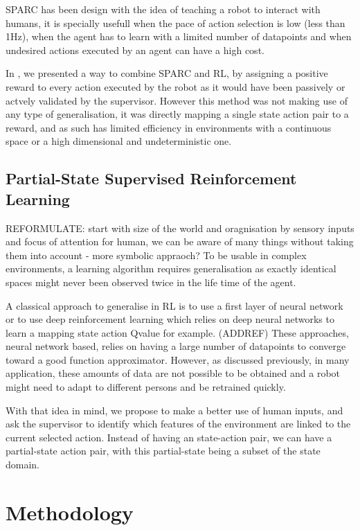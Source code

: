 \documentclass[letterpaper]{article} %
\begin{document}
SPARC has been design with the idea of teaching a robot to interact with humans,
it is specially usefull when the pace of action selection is low (less than
1Hz), when the agent has to learn with a limited number of datapoints and when
undesired actions executed by an agent can have a high cost. 

In \cite{senft2017supervised}, we presented a way to combine SPARC and RL, by
assigning a positive reward to every action executed by the robot as it would
have been passively or actvely validated by the supervisor. However this method
was not making use of any type of generalisation, it was directly mapping a
single state action pair to a reward, and as such has limited efficiency in
environments with a continuous space or a high dimensional and undeterministic
one.

\subsection{Partial-State Supervised Reinforcement Learning}

REFORMULATE: start with size of the world and oragnisation by sensory inputs and
focus of attention for human, we can be aware of many things without taking them
into account - more symbolic appraoch?
To be usable in complex environments, a
learning algorithm requires generalisation as exactly identical spaces might
never been observed twice in the life time of the agent.

A classical approach to generalise in RL is to use a first layer of neural
network or to use deep reinforcement learning which relies on deep neural
networks to learn a mapping state action Qvalue for example. (ADDREF)
These approaches, neural network based, relies on having a large number of
datapoints to converge toward a good function approximator. However, as
discussed previously, in many application, these amounts of data are not
possible to be obtained and a robot might need to adapt to different persons and
be retrained quickly.

With that idea in mind, we propose to make a better use of human inputs, and ask
the supervisor to identify which features of the environment are linked to the
current selected action. Instead of having an state-action pair, we
can have a partial-state action pair, with this partial-state being a subset of
the state domain.

\section{Methodology}
\end{document}
